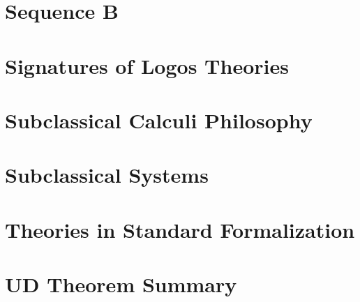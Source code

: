 \documentclass{report}
\begin{document}
\chapter{Sequence B}


\chapter{Signatures of Logos Theories}


\chapter{Subclassical Calculi Philosophy}


\chapter{Subclassical Systems}


\chapter{Theories in Standard Formalization}


\chapter{UD Theorem Summary}

\end{document}
